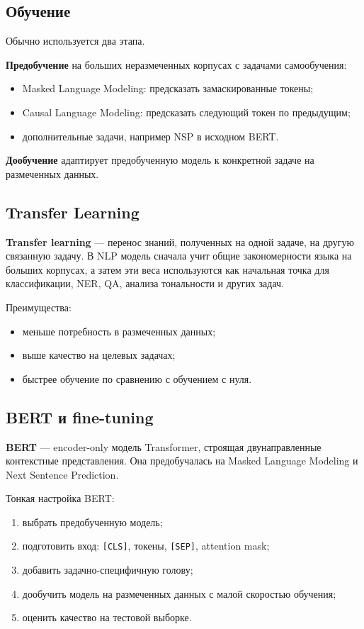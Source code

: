 \subsection*{Обучение}

Обычно используется два этапа.

\textbf{Предобучение} на больших неразмеченных корпусах с задачами самообучения:
\begin{itemize}
    \item Masked Language Modeling: предсказать замаскированные токены;
    \item Causal Language Modeling: предсказать следующий токен по предыдущим;
    \item дополнительные задачи, например NSP в исходном BERT.
\end{itemize}

\textbf{Дообучение} адаптирует предобученную модель к конкретной задаче на размеченных данных.

\subsection*{Transfer Learning}

\textbf{Transfer learning} --- перенос знаний, полученных на одной задаче, на другую связанную задачу. В NLP модель сначала учит общие закономерности языка на больших корпусах, а затем эти веса используются как начальная точка для классификации, NER, QA, анализа тональности и других задач.

Преимущества:
\begin{itemize}
    \item меньше потребность в размеченных данных;
    \item выше качество на целевых задачах;
    \item быстрее обучение по сравнению с обучением с нуля.
\end{itemize}

\subsection*{BERT и fine-tuning}

\textbf{BERT} --- encoder-only модель Transformer, строящая двунаправленные контекстные представления. Она предобучалась на Masked Language Modeling и Next Sentence Prediction.

Тонкая настройка BERT:
\begin{enumerate}
    \item выбрать предобученную модель;
    \item подготовить вход: \texttt{[CLS]}, токены, \texttt{[SEP]}, attention mask;
    \item добавить задачно-специфичную голову;
    \item дообучить модель на размеченных данных с малой скоростью обучения;
    \item оценить качество на тестовой выборке.
\end{enumerate}

